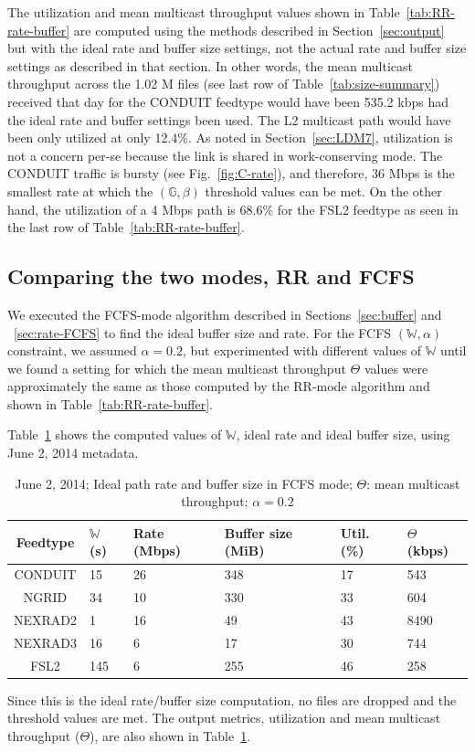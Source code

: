 The utilization and mean multicast throughput values shown
in Table~\ref{tab:RR-rate-buffer} are computed using the methods
described in Section~\ref{sec:output} but with the ideal rate and buffer
size settings, not the actual rate and buffer size settings as described
in that section. In other words, the mean multicast throughput across the 1.02 M files (see last row
of Table~\ref{tab:size-summary}) received that day for the CONDUIT feedtype
would have been 535.2 kbps had the ideal rate and buffer settings been used. The L2 multicast path would have been
only utilized at only 12.4\%.
As noted in Section~\ref{sec:LDM7}, utilization is not a concern per-se
because the link is shared in work-conserving mode. The CONDUIT traffic
is bursty (see Fig.~\ref{fig:C-rate}), and therefore, 36 Mbps is the smallest rate at which the
$(\mathbb{G},\beta)$ threshold values can be met. On the other hand,
the utilization of a 4 Mbps path is 68.6\% for the FSL2 feedtype
as seen in the last row of Table~\ref{tab:RR-rate-buffer}.

\subsection{Comparing the two modes, RR and FCFS}
\label{sec:FCFS-RR-comparison}
We executed the FCFS-mode algorithm described in Sections~\ref{sec:buffer} and ~\ref{sec:rate-FCFS} to find the ideal buffer size and rate. For
the FCFS $(\mathbb{W},\alpha)$ constraint, we assumed
$\alpha=0.2$, but experimented with different values of
$\mathbb{W}$ until we found a setting
for which the mean multicast throughput $\Theta$ values were approximately the same as those computed by the RR-mode
algorithm and shown in Table~\ref{tab:RR-rate-buffer}.

Table~\ref{tab:FCSF-rate-buffer} shows the computed
values of $\mathbb{W}$, ideal rate and ideal buffer size, using June 2, 2014 metadata.
\begin{table}
\caption{June 2, 2014; Ideal path rate and buffer size in FCFS mode; $\Theta$: mean multicast throughput; $\alpha = 0.2$}
\centering
\begin{tabular}{| c| p{0.25in} | p{0.4in} | p{0.4in} | p{0.3in}| p{0.5in}|} \hline
Feedtype & $\mathbb{W}$ (s) & Rate (Mbps) & Buffer size (MiB) & Util. (\%) & $\Theta$ (kbps)\\ \hline
CONDUIT  & 15 &26 &348 & 17 & 543 \\ \hline
NGRID &34 &10 &330 & 33 &604  \\ \hline
NEXRAD2 &1 & 16&49 &43 &8490   \\ \hline
NEXRAD3 &16&6 & 17 &30 &744  \\ \hline
FSL2 &145&6 & 255 &46 &258  \\ \hline
\end{tabular}
\label{tab:FCSF-rate-buffer}
\end{table}
Since this is the ideal rate/buffer size computation, no files are dropped
and the threshold values are met. The
output metrics, utilization and mean multicast throughput ($\Theta$), are
also shown in Table~\ref{tab:FCSF-rate-buffer}.

